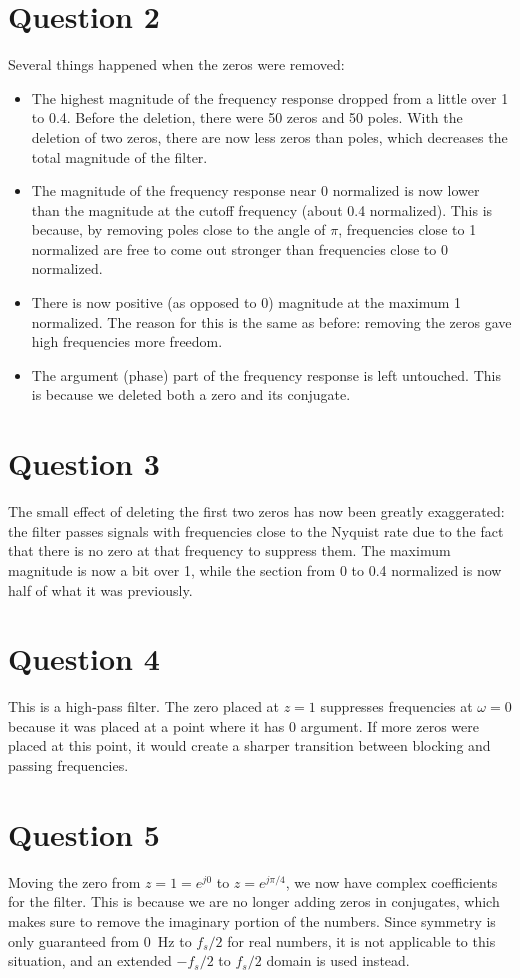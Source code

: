 \documentclass{article}
\begin{document}
\section*{Question 2}
Several things happened when the zeros were removed:
\begin{itemize}
    \item The highest magnitude of the frequency response dropped
    from a little over 1 to 0.4. Before the deletion, there were
    50 zeros and 50 poles. With the deletion of two zeros, there
    are now less zeros than poles, which decreases the total
    magnitude of the filter.
    \item The magnitude of the frequency response near 0 normalized
    is now lower than the magnitude at the cutoff frequency
    (about 0.4 normalized). This is because, by removing poles
    close to the angle of \(\pi\), frequencies close to
    1 normalized are free to come out stronger than frequencies
    close to 0 normalized.
    \item There is now positive (as opposed to 0) magnitude at
    the maximum 1 normalized. The reason for this is the same as
    before: removing the zeros gave high frequencies more
    freedom.
    \item The argument (phase) part of the frequency response
    is left untouched. This is because we deleted both a zero
    and its conjugate.
\end{itemize}

\section*{Question 3}
The small effect of deleting the first two zeros has now been
greatly exaggerated: the filter passes signals with frequencies
close to the Nyquist rate due to the fact that there is no
zero at that frequency to suppress them. The maximum magnitude
is now a bit over 1, while the section from 0 to 0.4
normalized is now half of what it was previously.

\section*{Question 4}
This is a high-pass filter. The zero placed at \(z = 1\)
suppresses frequencies at \(\omega = 0\) because it was placed
at a point where it has 0 argument. If more zeros were placed at
this point, it would create a sharper transition between blocking
and passing frequencies.

\section*{Question 5}
Moving the zero from \(z = 1 = e^{j0}\) to \(z = e^{j\pi/4}\),
we now have complex coefficients for the filter. This is because
we are no longer adding zeros in conjugates, which makes sure to
remove the imaginary portion of the numbers. Since symmetry is
only guaranteed from \SI{0}{\hertz} to \(f_s/2\) for real
numbers, it is not applicable to this situation, and an extended
\(-f_s/2\) to \(f_s/2\) domain is used instead.
\end{document}
